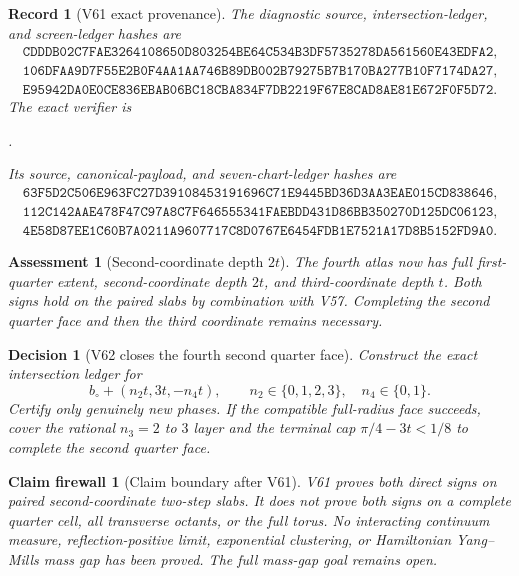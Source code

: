 \documentclass[11pt,oneside]{article}
\newtheorem{assessment}[theorem]{Assessment}
\newtheorem{firewall}[theorem]{Claim firewall}
\newtheorem{record}[theorem]{Record}
\newtheorem{decision}[theorem]{Decision}
\theoremstyle{definition}
\theoremstyle{remark}
\begin{document}
\begin{record}[V61 exact provenance]
\label{rec:newv61-provenance}
The diagnostic source, intersection-ledger, and screen-ledger
hashes are
\[
\begin{gathered}
\texttt{CDDDB02C7FAE3264108650D803254BE64C534B3DF5735278DA561560E43EDFA2},\\
\texttt{106DFAA9D7F55E2B0F4AA1AA746B89DB002B79275B7B170BA277B10F7174DA27},\\
\texttt{E95942DA0E0CE836EBAB06BC18CBA834F7DB2219F67E8CAD8AE81E672F0F5D72}.
\end{gathered}                                        \tag{61.11}
\]
The exact verifier is
\begin{center}
\footnotesize
{}.
\end{center}
Its source, canonical-payload, and seven-chart-ledger hashes are
\[
\begin{gathered}
\texttt{63F5D2C506E963FC27D39108453191696C71E9445BD36D3AA3EAE015CD838646},\\
\texttt{112C142AAE478F47C97A8C7F646555341FAEBDD431D86BB350270D125DC06123},\\
\texttt{4E58D87EE1C60B7A0211A9607717C8D0767E6454FDB1E7521A17D8B5152FD9A0}.
\end{gathered}                                        \tag{61.12}
\]
\end{record}

\begin{assessment}[Second-coordinate depth \(2t\)]
\label{ass:newv61}
The fourth atlas now has full first-quarter extent, second-coordinate
depth \(2t\), and third-coordinate depth \(t\).  Both signs hold on
the paired slabs by combination with V57.  Completing the second
quarter face and then the third coordinate remains necessary.
\end{assessment}

\begin{decision}[V62 closes the fourth second quarter face]
\label{dec:newv61-next}
Construct the exact intersection ledger for
\[
 b_\circ+(n_2t,3t,-n_4t),\qquad
 n_2\in\{0,1,2,3\},\quad n_4\in\{0,1\}.              \tag{61.13}
\]
Certify only genuinely new phases.  If the compatible full-radius
face succeeds, cover the rational \(n_3=2\) to \(3\) layer and the
terminal cap \(\pi/4-3t<1/8\) to complete the second quarter face.
\end{decision}

\begin{firewall}[Claim boundary after V61]
\label{fire:newv61-final}
V61 proves both direct signs on paired second-coordinate
two-step slabs.  It does not prove both signs on a complete quarter
cell, all transverse octants, or the full torus.  No interacting
continuum measure, reflection-positive limit, exponential
clustering, or Hamiltonian Yang--Mills mass gap has been proved.
The full mass-gap goal remains open.
\end{firewall}
\end{document}
